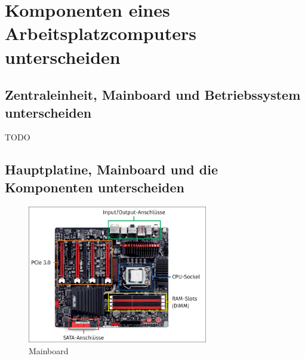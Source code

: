 \section{Komponenten eines Arbeitsplatzcomputers unterscheiden}
\subsection{Zentraleinheit, Mainboard und Betriebssystem unterscheiden}
    TODO

\subsection{Hauptplatine, Mainboard und die Komponenten unterscheiden}
    \begin{figure}[ht]
        \centering
        \includegraphics[width=0.7\textwidth]{./images/2.4.2_mainboard.png}
        \caption{Mainboard}\label{fig:Mainboard}
    \end{figure}
    
